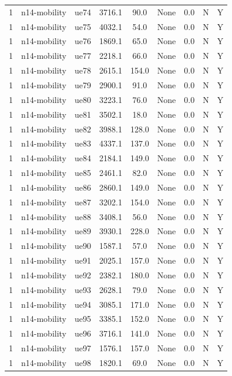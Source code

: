 \begin{table}[ht]
\begin{tabular}{|c|c|c|c|c|c|c|c|c|}
1 & n14-mobility & ue74 & 3716.1 & 90.0 & None & 0.0 & N & Y \\
1 & n14-mobility & ue75 & 4032.1 & 54.0 & None & 0.0 & N & Y \\
1 & n14-mobility & ue76 & 1869.1 & 65.0 & None & 0.0 & N & Y \\
1 & n14-mobility & ue77 & 2218.1 & 66.0 & None & 0.0 & N & Y \\
1 & n14-mobility & ue78 & 2615.1 & 154.0 & None & 0.0 & N & Y \\
1 & n14-mobility & ue79 & 2900.1 & 91.0 & None & 0.0 & N & Y \\
1 & n14-mobility & ue80 & 3223.1 & 76.0 & None & 0.0 & N & Y \\
1 & n14-mobility & ue81 & 3502.1 & 18.0 & None & 0.0 & N & Y \\
1 & n14-mobility & ue82 & 3988.1 & 128.0 & None & 0.0 & N & Y \\
1 & n14-mobility & ue83 & 4337.1 & 137.0 & None & 0.0 & N & Y \\
1 & n14-mobility & ue84 & 2184.1 & 149.0 & None & 0.0 & N & Y \\
1 & n14-mobility & ue85 & 2461.1 & 82.0 & None & 0.0 & N & Y \\
1 & n14-mobility & ue86 & 2860.1 & 149.0 & None & 0.0 & N & Y \\
1 & n14-mobility & ue87 & 3202.1 & 154.0 & None & 0.0 & N & Y \\
1 & n14-mobility & ue88 & 3408.1 & 56.0 & None & 0.0 & N & Y \\
1 & n14-mobility & ue89 & 3930.1 & 228.0 & None & 0.0 & N & Y \\
1 & n14-mobility & ue90 & 1587.1 & 57.0 & None & 0.0 & N & Y \\
1 & n14-mobility & ue91 & 2025.1 & 157.0 & None & 0.0 & N & Y \\
1 & n14-mobility & ue92 & 2382.1 & 180.0 & None & 0.0 & N & Y \\
1 & n14-mobility & ue93 & 2628.1 & 79.0 & None & 0.0 & N & Y \\
1 & n14-mobility & ue94 & 3085.1 & 171.0 & None & 0.0 & N & Y \\
1 & n14-mobility & ue95 & 3385.1 & 152.0 & None & 0.0 & N & Y \\
1 & n14-mobility & ue96 & 3716.1 & 141.0 & None & 0.0 & N & Y \\
1 & n14-mobility & ue97 & 1576.1 & 157.0 & None & 0.0 & N & Y \\
1 & n14-mobility & ue98 & 1820.1 & 69.0 & None & 0.0 & N & Y \\

\end{tabular}
\end{table}
